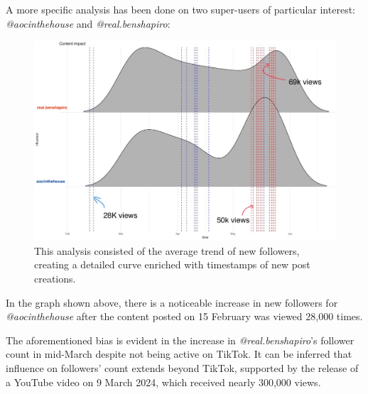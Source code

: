 A more specific analysis has been done on two super-users of particular interest: \textit{@aocinthehouse} and \textit{@real.benshapiro}:

\begin{figure}[H]
    \centering
    \includegraphics[width = .48\textwidth]{images/Final_ContentImpact_Custom.jpg}
    \caption*{This analysis consisted of the average trend of new followers, creating a detailed curve enriched with timestamps of new post creations.}
\end{figure}

In the graph shown above, there is a noticeable increase in new followers for \textit{@aocinthehouse} after the content posted on 15 February was viewed 28,000 times.

The aforementioned bias is evident in the increase in \textit{@real.benshapiro}'s follower count in mid-March despite not being active on TikTok. It can be inferred that influence on followers' count extends beyond TikTok, supported by the release of a YouTube video on 9 March 2024, which received nearly 300,000 views.